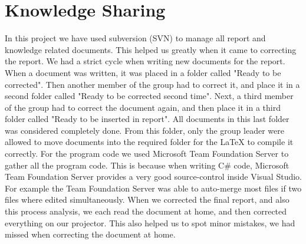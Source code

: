 \section{Knowledge Sharing}
In this project we have used subversion (SVN) to manage all report and knowledge related documents. This helped us greatly when it came to correcting the report. We had a strict cycle when writing new documents for the report. When a document was written, it was placed in a folder called "Ready to be corrected". Then another member of the group had to correct it, and place it in a second folder called "Ready to be corrected second time". Next, a third member of the group had to correct the document again, and then place it in a third folder called "Ready to be inserted in report". All documents in this last folder was considered completely done. From this folder, only the group leader were allowed to move documents into the required folder for the LaTeX to compile it correctly. For the program code we used Microsoft Team Foundation Server to gather all the program code. This is because when writing C\# code, Microsoft Team Foundation Server provides a very good source-control inside Visual Studio. For example the Team Foundation Server was able to auto-merge most files if two files where edited simultaneously. When we corrected the final report, and also this process analysis, we each read the document at home, and then corrected everything on our projector. This also helped us to spot minor mistakes, we had missed when correcting the document at home.